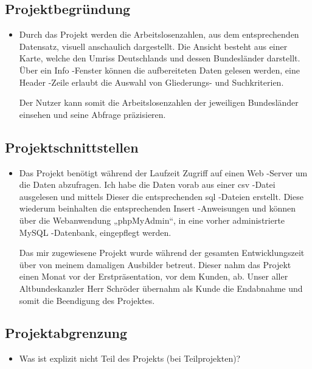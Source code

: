 \subsection{Projektbegründung} 
\label{sec:Projektbegruendung}
\begin{itemize}
	\item Durch das Projekt werden die Arbeitslosenzahlen, aus dem entsprechenden Datensatz, visuell anschaulich dargestellt. Die Ansicht besteht aus einer Karte, welche den Umriss Deutschlands und dessen Bundesländer darstellt. Über ein Info -Fenster können die aufbereiteten Daten gelesen werden, eine Header -Zeile erlaubt die Auswahl von Gliederungs- und Suchkriterien.  

Der Nutzer kann somit die Arbeitslosenzahlen der jeweiligen Bundesländer einsehen und seine Abfrage präzisieren. 
\end{itemize}


\subsection{Projektschnittstellen} 
\label{sec:Projektschnittstellen}
\begin{itemize}
	\item Das Projekt benötigt während der Laufzeit Zugriff auf einen Web -Server um die Daten abzufragen. Ich habe die Daten vorab aus einer csv -Datei ausgelesen und mittels Dieser die entsprechenden sql -Dateien erstellt. Diese wiederum beinhalten die entsprechenden Insert -Anweisungen und können über die Webanwendung „phpMyAdmin“, in eine vorher administrierte MySQL -Datenbank, eingepflegt werden. 

Das mir zugewiesene Projekt wurde während der gesamten Entwicklungszeit über von meinem damaligen Ausbilder betreut. Dieser nahm das Projekt einen Monat vor der Erstpräsentation, vor dem Kunden, ab. Unser aller Altbundeskanzler Herr Schröder übernahm als Kunde die Endabnahme und somit die Beendigung des Projektes. 
\end{itemize}


\subsection{Projektabgrenzung} 
\label{sec:Projektabgrenzung}
\begin{itemize}
	\item Was ist explizit nicht Teil des Projekts (\insb bei Teilprojekten)?
\end{itemize}
